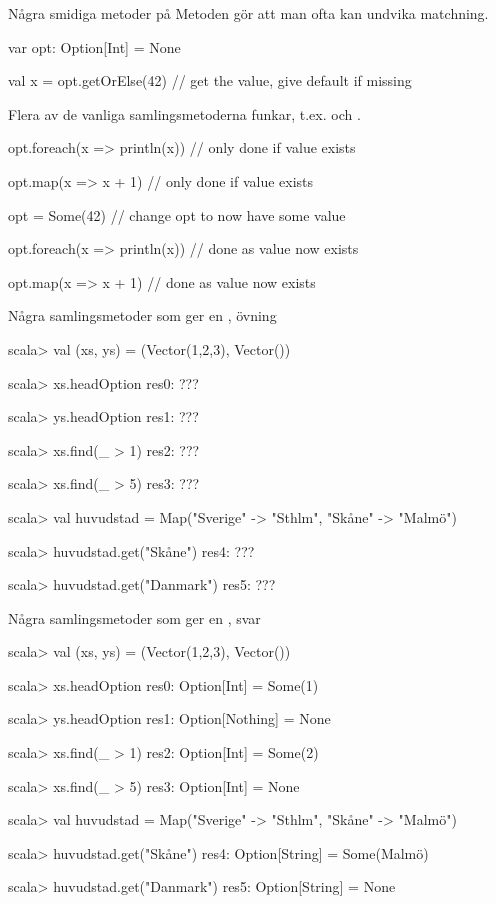 \begin{Slide}{Några smidiga metoder på }\SlideFontSmall
Metoden  gör att man ofta kan undvika matchning.
\begin{Code}
var opt: Option[Int] = None

val x = opt.getOrElse(42)   // get the value, give default if missing
\end{Code}

Flera av de vanliga samlingsmetoderna funkar, t.ex.  och .
\begin{Code}
opt.foreach(x => println(x)) // only done if value exists

opt.map(x => x + 1)          // only done if value exists

opt = Some(42)               // change opt to now have some value

opt.foreach(x => println(x)) // done as value now exists

opt.map(x => x + 1)          // done as value now exists

\end{Code}
\end{Slide}


\begin{Slide}{Några samlingsmetoder som ger en , övning}
\begin{REPL}
scala> val (xs, ys) = (Vector(1,2,3), Vector())

scala> xs.headOption
res0: ???

scala> ys.headOption
res1: ???

scala> xs.find(_ > 1)
res2: ???

scala> xs.find(_ > 5)
res3: ???

scala> val huvudstad = Map("Sverige" -> "Sthlm", "Skåne" -> "Malmö")

scala> huvudstad.get("Skåne")
res4: ???

scala> huvudstad.get("Danmark")
res5: ???
\end{REPL}
\end{Slide}

\begin{Slide}{Några samlingsmetoder som ger en , svar}
\begin{REPL}
scala> val (xs, ys) = (Vector(1,2,3), Vector())

scala> xs.headOption
res0: Option[Int] = Some(1)

scala> ys.headOption
res1: Option[Nothing] = None

scala> xs.find(_ > 1)
res2: Option[Int] = Some(2)

scala> xs.find(_ > 5)
res3: Option[Int] = None

scala> val huvudstad = Map("Sverige" -> "Sthlm", "Skåne" -> "Malmö")

scala> huvudstad.get("Skåne")
res4: Option[String] = Some(Malmö)

scala> huvudstad.get("Danmark")
res5: Option[String] = None
\end{REPL}
\end{Slide}
